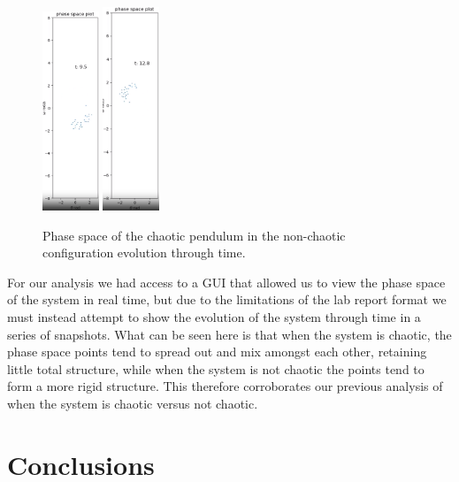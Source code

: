 \documentclass[11pt]{article} %
\begin{document}
\begin{figure}[H]
        \includegraphics[width=0.15\textwidth]{phase_4A.png}
        \includegraphics[width=0.15\textwidth]{phase_5A.png}
        \caption{Phase space of the chaotic pendulum in the non-chaotic configuration evolution through time.}
    \end{figure}
    For our analysis we had access to a GUI that allowed us to view the phase space of the system in real time, but due to the limitations of the lab report
    format we must instead attempt to show the evolution of the system through time in a series of snapshots. What can be seen here is that when the system is
    chaotic, the phase space points tend to spread out and mix amongst each other, retaining little total structure, while when the system is not chaotic the
    points tend to form a more rigid structure. This therefore corroborates our previous analysis of when the system is chaotic versus not chaotic.


\section{Conclusions}

\end{document}
